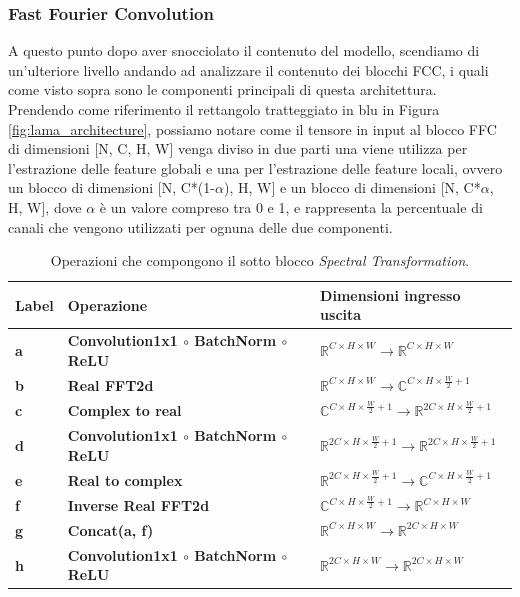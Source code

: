 \subsubsection{Fast Fourier Convolution}
A questo punto dopo aver snocciolato il contenuto del modello, scendiamo di un'ulteriore livello andando ad analizzare il contenuto dei blocchi FCC,
i quali come visto sopra sono le componenti principali di questa architettura.\\
Prendendo come riferimento il rettangolo tratteggiato in blu in Figura \ref{fig:lama_architecture}, possiamo notare come il tensore in input al
blocco FFC di dimensioni [N, C, H, W] venga diviso in due parti una viene utilizza per l'estrazione delle feature globali e una per l'estrazione delle
feature locali, ovvero un blocco di dimensioni [N, C*(1-$\alpha$), H, W] e un blocco di dimensioni
[N, C*$\alpha$, H, W], dove $\alpha$ è un valore compreso tra 0 e 1, e rappresenta la percentuale di canali che vengono utilizzati per ognuna delle
due componenti.

\begin{table}[H]
    \centering
    \renewcommand{\arraystretch}{1.5} %
    \begin{tabular}{|l|l|l|}
        \hline
        \textbf{Label} & \textbf{Operazione} & \textbf{Dimensioni ingresso uscita} \\ \hline
        \textbf{a} & \textbf{Convolution1x1 $\circ$ BatchNorm $\circ$ ReLU} & $\mathbb{R}^{C \times H \times W} \rightarrow \mathbb{R}^{C \times H \times W}$ \\ \hline
        \textbf{b} & \textbf{Real FFT2d} & $\mathbb{R}^{C \times H \times W} \rightarrow \mathbb{C}^{C \times H \times \frac{W}{2}+1}$ \\ \hline
        \textbf{c} & \textbf{Complex to real} & $\mathbb{C}^{C \times H \times \frac{W}{2}+1} \rightarrow \mathbb{R}^{2C \times H \times \frac{W}{2}+1}$ \\ \hline
        \textbf{d} & \textbf{Convolution1x1 $\circ$ BatchNorm $\circ$ ReLU} & $\mathbb{R}^{2C \times H \times \frac{W}{2}+1} \rightarrow \mathbb{R}^{2C \times H \times \frac{W}{2}+1}$ \\ \hline
        \textbf{e} & \textbf{Real to complex} & $\mathbb{R}^{2C \times H \times \frac{W}{2}+1} \rightarrow \mathbb{C}^{C \times H \times \frac{W}{2}+1}$ \\ \hline
        \textbf{f} & \textbf{Inverse Real FFT2d} & $\mathbb{C}^{C \times H \times \frac{W}{2}+1} \rightarrow \mathbb{R}^{C \times H \times W}$ \\ \hline
        \textbf{g} & \textbf{Concat(a, f)} & $\mathbb{R}^{C \times H \times W} \rightarrow \mathbb{R}^{2C \times H \times W}$ \\ \hline
        \textbf{h} & \textbf{Convolution1x1 $\circ$ BatchNorm $\circ$ ReLU} & $\mathbb{R}^{2C \times H \times W} \rightarrow \mathbb{R}^{2C \times H \times W}$ \\ \hline
    \end{tabular}
    \caption{Operazioni che compongono il sotto blocco \textit{Spectral Transformation}.}
    \label{tab:spectral_transformation}
\end{table}

